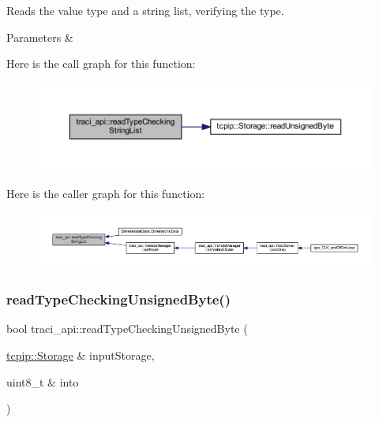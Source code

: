 Reads the value type and a string list, verifying the type. 


\begin{DoxyParams}{Parameters}
{\em } & \\
\hline
\end{DoxyParams}
Here is the call graph for this function\+:\nopagebreak
\begin{figure}[H]
\begin{center}
\leavevmode
\includegraphics[width=350pt]{namespacetraci__api_aa16305c07ac5f8221d9099f2e3a7531c_cgraph}
\end{center}
\end{figure}
Here is the caller graph for this function\+:\nopagebreak
\begin{figure}[H]
\begin{center}
\leavevmode
\includegraphics[width=350pt]{namespacetraci__api_aa16305c07ac5f8221d9099f2e3a7531c_icgraph}
\end{center}
\end{figure}
\mbox{\label{namespacetraci__api_ac95893093cb3b220faafd74ce62abba3}} 
\subsubsection{\texorpdfstring{read\+Type\+Checking\+Unsigned\+Byte()}{readTypeCheckingUnsignedByte()}}
{\footnotesize\ttfamily bool traci\+\_\+api\+::read\+Type\+Checking\+Unsigned\+Byte (\begin{DoxyParamCaption}\item[{\hyperlink{classtcpip_1_1_storage}{tcpip\+::\+Storage} \&}]{input\+Storage,  }\item[{uint8\+\_\+t \&}]{into }\end{DoxyParamCaption})}



